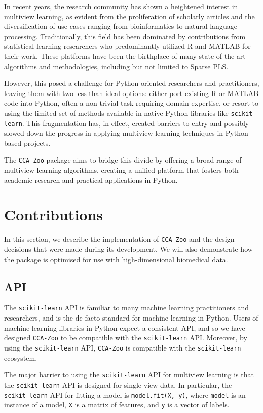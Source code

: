 In recent years, the research community has shown a heightened interest in multiview learning, as evident from the proliferation of scholarly articles and the diversification of use-cases ranging from bioinformatics to natural language processing.
Traditionally, this field has been dominated by contributions from statistical learning researchers who predominantly utilized R and MATLAB for their work.
These platforms have been the birthplace of many state-of-the-art algorithms and methodologies, including but not limited to Sparse PLS.

However, this posed a challenge for Python-oriented researchers and practitioners, leaving them with two less-than-ideal options: either port existing R or MATLAB code into Python, often a non-trivial task requiring domain expertise, or resort to using the limited set of methods available in native Python libraries like \texttt{scikit-learn}.
This fragmentation has, in effect, created barriers to entry and possibly slowed down the progress in applying multiview learning techniques in Python-based projects.

The \texttt{CCA-Zoo} package aims to bridge this divide by offering a broad range of multiview learning algorithms, creating a unified platform that fosters both academic research and practical applications in Python.

\section{Contributions}

In this section, we describe the implementation of \texttt{CCA-Zoo} and the design decisions that were made during its development.
We will also demonstrate how the package is optimised for use with high-dimensional biomedical data.

\subsection{API}

The \texttt{scikit-learn} API is familiar to many machine learning practitioners and researchers, and is the de facto standard for machine learning in Python.
Users of machine learning libraries in Python expect a consistent API, and so we have designed \texttt{CCA-Zoo} to be compatible with the \texttt{scikit-learn} API.
Moreover, by using the \texttt{scikit-learn} API, \texttt{CCA-Zoo} is compatible with the \texttt{scikit-learn} ecosystem.

The major barrier to using the \texttt{scikit-learn} API for multiview learning is that the \texttt{scikit-learn} API is designed for single-view data.
In particular, the \texttt{scikit-learn} API for fitting a model is \texttt{model.fit(X, y)}, where \texttt{model} is an instance of a model, \texttt{X} is a matrix of features, and \texttt{y} is a vector of labels.

